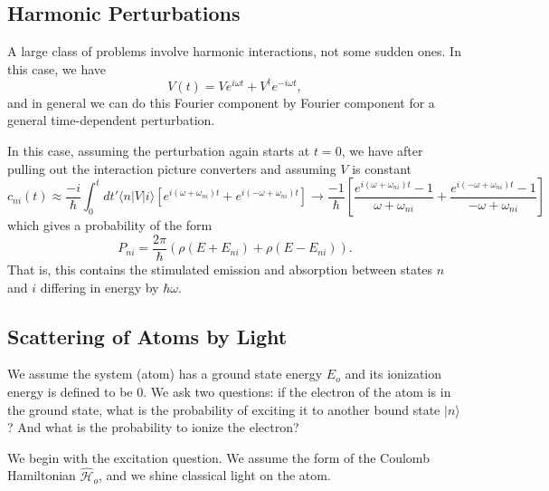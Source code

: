 \documentclass[fontsize=12pt]{scrartcl}
\newcommand{\la}{\langle}
\newcommand{\ra}{\rangle}
\newcommand{\Ham}{\hat{\mathcal{H}}}
\begin{document}
\subsection{Harmonic Perturbations}

A large class of problems involve harmonic interactions, not some sudden ones. In this case, we have $$V(t)=Ve^{i\omega t}+V^\dagger e^{-i\omega t},$$ and in general we can do this Fourier component by Fourier component for a general time-dependent perturbation.

In this case, assuming the perturbation again starts at $t=0$, we have after pulling out the interaction picture converters and assuming $V$ is constant $$c_{ni}(t)\approx \frac{-i}{\hbar}\int_0^t dt' \la n|V|i\ra\left[ e^{i(\omega+\omega_{ni})t} + e^{i(-\omega+\omega_{ni})t} \right]\to \frac{-1}{\hbar}\left[\frac{e^{i(\omega+\omega_{ni})t}-1}{\omega+\omega_{ni}}+\frac{e^{i(-\omega+\omega_{ni})t}-1}{-\omega+\omega_{ni}}\right]$$ which gives a probability of the form $$P_{ni}=\frac{2\pi}{\hbar}(\rho(E+E_{ni})+\rho(E-E_{ni})).$$ That is, this contains the stimulated emission and absorption between states $n$ and $i$ differing in energy by $\hbar\omega$.

\subsection{Scattering of Atoms by Light}

We assume the system (atom) has a ground state energy $E_o$ and its ionization energy is defined to be $0$. We ask two questions: if the electron of the atom is in the ground state, what is the probability of exciting it to another bound state $|n\ra$? And what is the probability to ionize the electron?

We begin with the excitation question. We assume the form of the Coulomb Hamiltonian $\Ham_o$, and we shine classical light on the atom.
\end{document}
